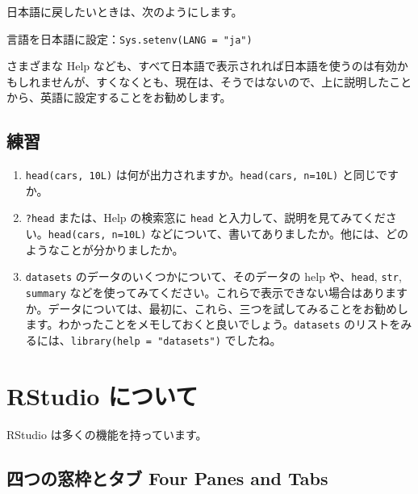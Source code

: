 \documentclass[
  xelatex, ja=standard]{bxjsbook}
\providecommand{\tightlist}{%
  \setlength{\itemsep}{0pt}\setlength{\parskip}{0pt}}
\theoremstyle{definition}
\theoremstyle{definition}
\theoremstyle{definition}
\theoremstyle{definition}
\theoremstyle{remark}
\begin{document}
日本語に戻したいときは、次のようにします。

言語を日本語に設定：\texttt{Sys.setenv(LANG\ =\ "ja")}

さまざまな Help なども、すべて日本語で表示されれば日本語を使うのは有効かもしれませんが、すくなくとも、現在は、そうではないので、上に説明したことから、英語に設定することをお勧めします。

\hypertarget{ux7df4ux7fd2-1}{%
\subsection{練習}\label{ux7df4ux7fd2-1}}

\begin{enumerate}
\def\labelenumi{\arabic{enumi}.}
\tightlist
\item
  \texttt{head(cars,\ 10L)} は何が出力されますか。\texttt{head(cars,\ n=10L)} と同じですか。
\item
  \texttt{?head} または、Help の検索窓に \texttt{head} と入力して、説明を見てみてください。\texttt{head(cars,\ n=10L)} などについて、書いてありましたか。他には、どのようなことが分かりましたか。
\item
  \texttt{datasets} のデータのいくつかについて、そのデータの help や、\texttt{head}, \texttt{str}, \texttt{summary} などを使ってみてください。これらで表示できない場合はありますか。データについては、最初に、これら、三つを試してみることをお勧めします。わかったことをメモしておくと良いでしょう。\texttt{datasets} のリストをみるには、\texttt{library(help\ =\ "datasets")} でしたね。
\end{enumerate}

\hypertarget{rstudio-ux306bux3064ux3044ux3066}{%
\section{RStudio について}\label{rstudio-ux306bux3064ux3044ux3066}}

RStudio は多くの機能を持っています。

\hypertarget{ux56dbux3064ux306eux7a93ux67a0ux3068ux30bfux30d6-four-panes-and-tabs}{%
\subsection{四つの窓枠とタブ Four Panes and Tabs}\label{ux56dbux3064ux306eux7a93ux67a0ux3068ux30bfux30d6-four-panes-and-tabs}}
\end{document}

